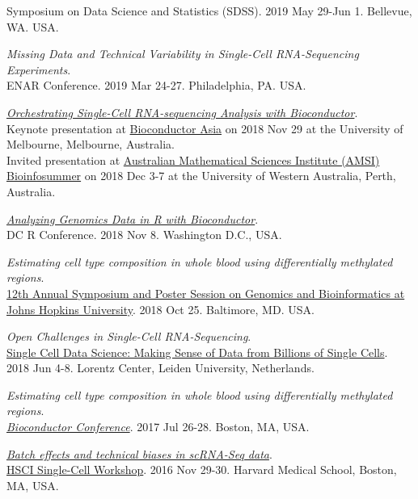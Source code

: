 \documentclass[10pt]{article}
\begin{document}
Symposium on Data Science and Statistics (SDSS). 2019 May 29-Jun 1. Bellevue, WA. USA.
\item 
{\it Missing Data and Technical Variability in Single-Cell RNA-Sequencing Experiments}. \\ 
ENAR Conference. 2019 Mar 24-27. Philadelphia, PA. USA.
\item 
{\it \href{https://speakerdeck.com/stephaniehicks/orchestrating-single-cell-rna-sequencing-analysis-with-bioconductor}{Orchestrating Single-Cell RNA-sequencing Analysis with Bioconductor}}. \\
Keynote presentation at \href{https://bioconductor.github.io/BiocAsia/}{Bioconductor Asia} on 2018 Nov 29 at the University of Melbourne, Melbourne, Australia.  \\
Invited presentation at \href{https://bis.amsi.org.au}{Australian Mathematical Sciences Institute (AMSI) Bioinfosummer} on 2018 Dec 3-7 at the University of Western Australia, Perth, Australia.
\item 
{\it \href{https://speakerdeck.com/stephaniehicks/analyzing-genomics-data-in-r-with-bioconductor}{Analyzing Genomics Data in R with Bioconductor}}. \\
DC R Conference. 2018 Nov 8. Washington D.C., USA.
\item 
{\it Estimating cell type composition in whole blood using differentially methylated regions}. \\
\href{http://genomics.jhu.edu/symposium.html}{12th Annual Symposium and Poster Session on Genomics and Bioinformatics at Johns Hopkins University}. 2018 Oct 25. Baltimore, MD. USA.
\item 
{\it Open Challenges in Single-Cell RNA-Sequencing}. \\ 
\href{http://lorentzcenter.nl/lc/web/2018/986/info.php3?wsid=986&venue=Oort}{Single Cell Data Science: Making Sense of Data from Billions of Single Cells}. 2018 Jun 4-8. Lorentz Center, Leiden University, Netherlands.
\item 
{\it Estimating cell type composition in whole blood using differentially methylated regions}. \\
\href{http://bioconductor.org/help/course-materials/2017/BioC2017/}{{\it Bioconductor Conference}}. 2017 Jul 26-28. Boston, MA, USA.
\item 
{\it \href{https://github.com/hms-dbmi/scw/tree/master/scw2016/tutorials/batcheffects}{Batch effects and technical biases in scRNA-Seq data}}. \\ 
\href{http://hsci.harvard.edu/event/save-date-single-cell-analysis-workshop}{HSCI Single-Cell Workshop}. 2016 Nov 29-30. Harvard Medical School, Boston, MA, USA.
\end{document}
